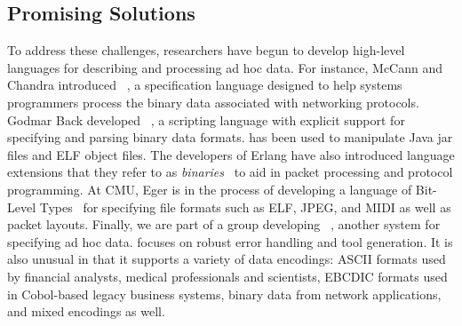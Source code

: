 \subsection{Promising Solutions}

To address these challenges, 
researchers have begun to develop high-level languages 
for describing and processing ad hoc data.  For instance,
McCann and Chandra introduced
\packettypes{}~\cite{sigcomm00}, a specification language designed to help 
systems programmers process the binary data associated
with networking protocols.  Godmar Back developed
\datascript{}~\cite{gpce02}, a scripting language with explicit
support for specifying and parsing binary data formats. \datascript{}
has been used to manipulate Java jar files and ELF object files.  The
developers of Erlang have also introduced language extensions that
they refer to as {\em binaries}~\cite{erlang-bits,gustafsson+:binaries} 
to aid in packet
processing and protocol programming.  At CMU, Eger is in the process
of developing a
language of Bit-Level Types~\cite{eger:blt} for specifying file
formats such as ELF, JPEG, and MIDI as well as packet layouts.
Finally, we are part of a group developing
\pads{}~\cite{fisher+:pads}, another system for specifying ad hoc data.
\pads{} focuses on robust error handling and tool generation.
It is also unusual in that it supports a variety of data encodings:
ASCII formats used by financial analysts, medical professionals and scientists,
EBCDIC formats used in Cobol-based legacy business systems,
binary data from network applications, and mixed encodings as well.



